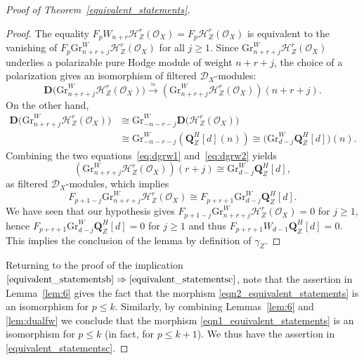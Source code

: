 \documentclass[JEP,XML,SOM,Unicode]{cedram}
\newcommand{\DXmodules}{$\cD_X$\nobreakdash-mod\-ules\xspace}
\theoremstyle{plain}
\theoremstyle{definition}
\newcommand\bD{{\mathbf D}}
\newcommand\Q{{\mathbf Q}}
\newcommand\cD{\mathcal{D}}
\newcommand\cH{\mathcal{H}}
\newcommand\cO{\mathcal{O}}
\newcommand\cH{\mathcal{H}}
\newcommand\cO{\mathcal{O}}
\newcommand\gr{\mathrm{Gr}}
\begin{document}
\begin{proof}[Proof of Theorem~\ref{equivalent_statements}]
\begin{proof}
The equality $F_pW_{n+r}\cH^r_Z(\cO_X)=F_p\cH^r_Z(\cO_X)$ is equivalent to the vanishing of
$F_p \gr^W_{n+r+j}\cH^r_Z(\cO_X)$ for all $j\geq 1$. Since $\gr^W_{n+r+j}\cH^r_Z(\cO_X)$ underlies a polarizable pure Hodge module of weight $n+r+j$, the choice of a polarization gives an isomorphism of filtered \DXmodules:
\begin{equation}\label{eq:dgrw1}
\bD\big(\gr^W_{n+r+j}\cH^r_Z(\cO_X)\big) \overset{\simeq}\longrightarrow \left(\gr^W_{n+r+j}\cH^r_Z(\cO_X)\right) (n+r+j).
\end{equation}
On the other hand,
\begin{equation}\label{eq:dgrw2}
\begin{aligned}
\bD\big(\gr^W_{n+r+j}\cH^r_Z(\cO_X)\big) &\cong \gr^W_{-n-r-j} \bD\big(\cH^r_Z(\cO_X)\big) \\
& \cong \gr^W_{-n-r-j} \left(\Q_Z^H[d](n)\right) \cong \big(\gr^W_{d-j} \Q_Z^H[d]\big)(n).
\end{aligned}
\end{equation}
Combining the two equations~\eqref{eq:dgrw1} and~\eqref{eq:dgrw2} yields\vspace*{-3pt}
\[
\left(\gr^W_{n+r+j}\cH^r_Z(\cO_X)\right) (r+j) \cong \gr^W_{d-j}\Q_Z^H[d],
\]
as filtered \DXmodules, which implies\vspace*{-3pt}\enlargethispage{\baselineskip}
\[
F_{p+1-j} \gr^W_{n+r+j}\cH^r_Z(\cO_X) \cong F_{p+r+1} \gr^W_{d-j}\Q^H_Z[d].
\]
We have seen that our hypothesis gives $F_{p+1-j} \gr^W_{n+r+j}\cH^r_Z(\cO_X)=0$ for $j\geq 1$, hence
$F_{p+r+1} \gr^W_{d-j}\Q_Z^H[d]=0$ for $j\geq 1$ and thus
$F_{p+r+1} W_{d-1}\Q_Z^H[d]=0$. This implies the conclusion of the lemma by definition of $\gamma_Z$.
\end{proof}

Returning to the proof of the implication $\eqref{equivalent_statementsb}\Rightarrow\eqref{equivalent_statementsc}$,
note that the assertion in Lemma~\ref{lem:6}
gives the fact that the morphism \eqref{eqn2_equivalent_statements} is an isomorphism for $p\leq k$.
Similarly, by combining Lemmas~\ref{lem:6} and \ref{lem:dualfw} we conclude that the morphism
\eqref{eqn1_equivalent_statements} is an isomorphism for $p\leq k$ (in fact, for $p\leq k+1$). We thus have the assertion in \eqref{equivalent_statementsc}.


\end{proof}
\end{document}
